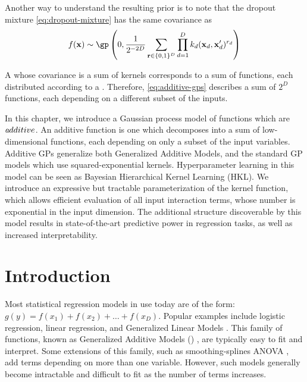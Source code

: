 Another way to understand the resulting prior is to note that the dropout mixture \eqref{eq:dropout-mixture} has the same covariance as
\begin{align}
f(\vx) \sim \textnormal{\gp} \left(0, \frac{1}{2^{-2D}} \sum_{\vr \in \{0,1\}^D}  \prod_{d=1}^D k_d(\vx_d, \vx_d')^{r_d} \right)
\label{eq:additive-gps}
\end{align}

A \gp{} whose covariance is a sum of kernels corresponds to a sum of functions, each distributed according to a \gp{}.  Therefore, \eqref{eq:additive-gps} describes a sum of $2^D$ functions, each depending on a different subset of the inputs.



In this chapter, we introduce a Gaussian process model of functions which are $\textit additive$.  An additive function is one which decomposes into a sum of low-dimensional functions, each depending on only a subset of the input variables. Additive GPs generalize both Generalized Additive Models, and the standard GP models which use squared-exponential kernels.  Hyperparameter learning in this model can be seen as Bayesian Hierarchical Kernel Learning (HKL).  We introduce an expressive but tractable parameterization of the kernel function, which allows efficient evaluation of all input interaction terms, whose number is exponential in the input dimension.  The additional structure discoverable by this model results in state-of-the-art predictive power in regression tasks, as well as increased interpretability.

\section{Introduction}
Most statistical regression models in use today are of the form: $g(y) = f(x_1) + f(x_2) + \dots + f(x_D)$.
Popular examples include logistic regression, linear regression, and Generalized Linear Models \citep{nelder1972generalized}.
This family of functions, known as Generalized Additive Models (\GAM{}) \citep{hastie1990generalized}, are typically easy to fit and interpret.   Some extensions of this family, such as smoothing-splines ANOVA \citep{wahba1990spline}, add terms depending on more than one variable.
However, such models generally become intractable and difficult to fit as the number of terms increases.


